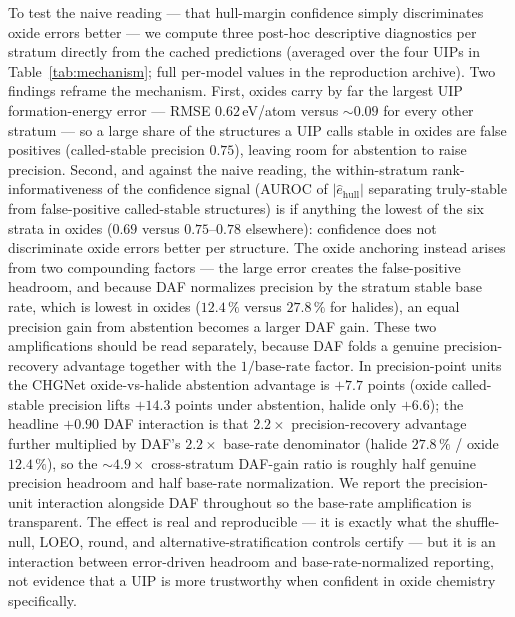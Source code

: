 \documentclass[aip,jcp,preprint,superscriptaddress,amsmath,amssymb]{revtex4-2}
\begin{document}
To test the naive reading --- that hull-margin confidence simply discriminates oxide errors
better --- we compute three post-hoc descriptive diagnostics per stratum directly from the
cached predictions (averaged over the four UIPs in Table~\ref{tab:mechanism}; full per-model
values in the reproduction archive). Two findings reframe the mechanism. First, oxides carry by
far the largest UIP formation-energy error --- RMSE $0.62$\,eV/atom versus $\sim\!0.09$ for every
other stratum --- so a large share of the structures a UIP calls stable in oxides are false
positives (called-stable precision $0.75$), leaving room for abstention to raise precision.
Second, and against the naive reading, the within-stratum rank-informativeness of the
confidence signal (AUROC of $|\hat{e}_{\mathrm{hull}}|$ separating truly-stable from
false-positive called-stable structures) is if anything the lowest of the six strata in
oxides ($0.69$ versus $0.75$--$0.78$ elsewhere): confidence does not discriminate oxide errors
better per structure. The oxide anchoring instead arises from two compounding factors --- the
large error creates the false-positive headroom, and because DAF normalizes precision by the
stratum stable base rate, which is lowest in oxides ($12.4\,\%$ versus $27.8\,\%$ for halides),
an equal precision gain from abstention becomes a larger DAF gain. These two amplifications
should be read separately, because DAF folds a genuine precision-recovery advantage together
with the $1/\text{base-rate}$ factor. In precision-point units the CHGNet oxide-vs-halide
abstention advantage is $+7.7$ points (oxide called-stable precision lifts $+14.3$ points under
abstention, halide only $+6.6$); the headline $+0.90$ DAF interaction is that $2.2\times$
precision-recovery advantage further multiplied by DAF's $2.2\times$ base-rate denominator
(halide $27.8\,\%$ / oxide $12.4\,\%$), so the $\sim\!4.9\times$ cross-stratum DAF-gain ratio
is roughly half genuine precision headroom and half base-rate normalization. We report the
precision-unit interaction alongside DAF throughout so the base-rate amplification is transparent.
The effect is
real and reproducible --- it is exactly what the shuffle-null, LOEO, round, and
alternative-stratification controls certify --- but it is an interaction between error-driven
headroom and base-rate-normalized reporting, not evidence that a UIP is more trustworthy when
confident in oxide chemistry specifically.
\end{document}

